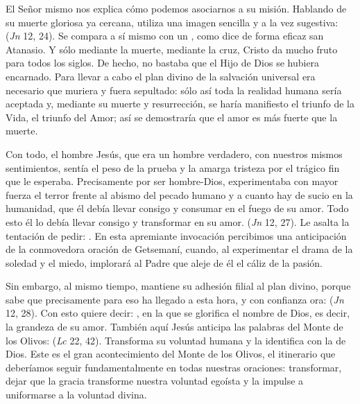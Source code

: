 \begin{body}
El Señor mismo nos explica cómo podemos asociarnos a su misión. Hablando de su muerte gloriosa ya cercana, utiliza una imagen sencilla y a la vez sugestiva:  (\textit{Jn} 12, 24). Se compara a sí mismo con un , como dice de forma eficaz san Atanasio. Y sólo mediante la muerte, mediante la cruz, Cristo da mucho fruto para todos los siglos. De hecho, no bastaba que el Hijo de Dios se hubiera encarnado. Para llevar a cabo el plan divino de la salvación universal era necesario que muriera y fuera sepultado: sólo así toda la realidad humana sería aceptada y, mediante su muerte y resurrección, se haría manifiesto el triunfo de la Vida, el triunfo del Amor; así se demostraría que el amor es más fuerte que la muerte.

Con todo, el hombre Jesús, que era un hombre verdadero, con nuestros mismos sentimientos, sentía el peso de la prueba y la amarga tristeza por el trágico fin que le esperaba. Precisamente por ser hombre-Dios, experimentaba con mayor fuerza el terror frente al abismo del pecado humano y a cuanto hay de sucio en la humanidad, que él debía llevar consigo y consumar en el fuego de su amor. Todo esto él lo debía llevar consigo y transformar en su amor.  (\textit{Jn} 12, 27). Le asalta la tentación de pedir: . En esta apremiante invocación percibimos una anticipación de la conmovedora oración de Getsemaní, cuando, al experimentar el drama de la soledad y el miedo, implorará al Padre que aleje de él el cáliz de la pasión.

Sin embargo, al mismo tiempo, mantiene su adhesión filial al plan divino, porque sabe que precisamente para eso ha llegado a esta hora, y con confianza ora:  (\textit{Jn} 12, 28). Con esto quiere decir: , en la que se glorifica el nombre de Dios, es decir, la grandeza de su amor. También aquí Jesús anticipa las palabras del Monte de los Olivos:  (\textit{Lc} 22, 42). Transforma su voluntad humana y la identifica con la de Dios. Este es el gran acontecimiento del Monte de los Olivos, el itinerario que deberíamos seguir fundamentalmente en todas nuestras oraciones: transformar, dejar que la gracia transforme nuestra voluntad egoísta y la impulse a uniformarse a la voluntad divina.


\end{body}

